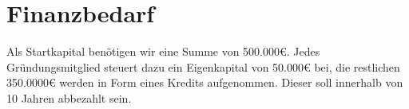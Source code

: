 \chapter{Finanzbedarf}
\label{cha:10}
Als Startkapital benötigen wir eine Summe von 500.000€. Jedes Gründungsmitglied steuert dazu ein Eigenkapital von 50.000€ bei, die restlichen 350.0000€ werden in Form eines Kredits aufgenommen. Dieser soll innerhalb von 10 Jahren abbezahlt sein.